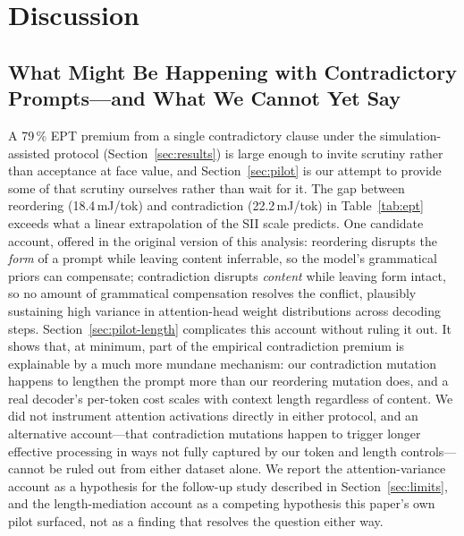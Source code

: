 \documentclass[conference]{IEEEtran}
\begin{document}
\section{Discussion}
\label{sec:discussion}
\subsection{What Might Be Happening with Contradictory Prompts---and What We Cannot Yet Say}
A 79\,\% EPT premium from a single contradictory clause under the
simulation-assisted protocol (Section~\ref{sec:results}) is large
enough to invite scrutiny rather than acceptance at face value, and
Section~\ref{sec:pilot} is our attempt to provide some of that
scrutiny ourselves rather than wait for it. The gap between reordering
(18.4\,mJ/tok) and contradiction (22.2\,mJ/tok) in
Table~\ref{tab:ept} exceeds what a linear extrapolation of the SII
scale predicts. One candidate account, offered in the original
version of this analysis: reordering disrupts the \emph{form} of a
prompt while leaving content inferrable, so the model's grammatical
priors can compensate; contradiction disrupts \emph{content} while
leaving form intact, so no amount of grammatical compensation resolves
the conflict, plausibly sustaining high variance in attention-head
weight distributions across decoding steps.
Section~\ref{sec:pilot-length} complicates this account without
ruling it out. It shows that, at minimum, part of the empirical
contradiction premium is explainable by a much more mundane mechanism:
our contradiction mutation happens to lengthen the prompt more than
our reordering mutation does, and a real decoder's per-token cost
scales with context length regardless of content. We did not
instrument attention activations directly in either protocol, and an
alternative account---that contradiction mutations happen to trigger
longer effective processing in ways not fully captured by our token
and length controls---cannot be ruled out from either dataset alone.
We report the attention-variance account as a hypothesis for the
follow-up study described in Section~\ref{sec:limits}, and the
length-mediation account as a competing hypothesis this paper's own
pilot surfaced, not as a finding that resolves the question either
way.
\end{document}
